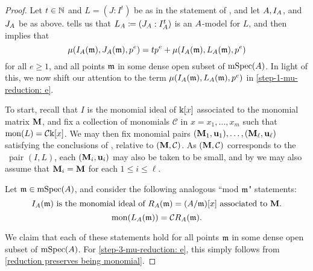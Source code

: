 \documentclass{article}
\begin{document}
\begin{proof}  Let $t \in \mathbb{N}$ and $L = (J: I^t)$ be as in the statement of , and let $A, I_A$, and $J_A$ be as above.   tells us that $L_A \coloneqq (J_A: I_A^t)$ is an $A$-model for $L$, and  then implies that
\begin{equation}
\label{step-1-mu-reduction: e}
\mu(I_A(\mathfrak{m}), J_A(\mathfrak{m}), p^e) = t p^e + \mu(I_A(\mathfrak{m}), L_A(\mathfrak{m}), p^e)
 \end{equation}
%
for all $e \geq 1$, and all points $\mathfrak{m}$ in some dense open subset of $\operatorname{mSpec}(A)$.  In light of this, we now shift our attention to the  term $\mu(I_A(\mathfrak{m}), L_A(\mathfrak{m}), p^e)$ in \eqref{step-1-mu-reduction: e}.  

To start, recall that $I$ is the monomial ideal of $\Bbbk[x]$ associated to the monomial matrix $\mathbf{M}$, and fix a collection of monomials $\mathcal{C}$ in $x=x_1, \ldots, x_m$ such that $\operatorname{mon}(L) = \mathcal{C} \Bbbk[x]$.   We may then fix monomial pairs $(\mathbf{M}_1, \mathbf{u}_1), \ldots, (\mathbf{M}_{\ell}, \mathbf{u}_{\ell})$ satisfying the conclusions of , relative to $(\mathbf{M}, \mathcal{C})$.  As $(\mathbf{M}, \mathcal{C})$ corresponds to the \smallcompatible\ pair $(I, L)$, each $(\mathbf{M}_i, \mathbf{u}_i)$ may also be taken to be small, and by  we may also assume that $\mathbf{M}_i = \mathbf{M}$ for each $1 \leq i \leq \ell$. 

Let $\mathfrak{m} \in \operatorname{mSpec}(A)$, and consider the following analogous ``mod $\mathfrak{m}$" statements:
%
\begin{equation}
\label{step-3-mu-reduction: e}
\text{$I_A(\mathfrak{m})$ is the monomial ideal of $R_A(\mathfrak{m}) = (A/\mathfrak{m})[x]$ associated to $\mathbf{M}$.}
\end{equation}
%
\begin{equation}
\label{step-2-mu-reduction: e}
\operatorname{mon}(L_A(\mathfrak{m})) = \mathcal{C} R_A(\mathfrak{m}).
\end{equation}


We claim that each of these statements hold for all points $\mathfrak{m}$ in some dense open subset of $\operatorname{mSpec}(A)$.  For \eqref{step-3-mu-reduction: e}, this simply follows from  \ref{reduction preserves being monomial}.  


\end{proof}
\end{document}
